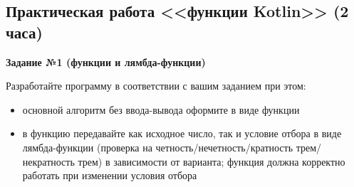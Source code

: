 \subsection{Практическая работа <<функции Kotlin>> (2 часа)}

\textbf{Задание №1 (функции и лямбда-функции)} 

Разработайте программу в соответствии с вашим заданием при этом:

\begin{itemize}
\item основной алгоритм без ввода-вывода оформите в виде функции
\item в функцию передавайте как исходное число, так и условие отбора в виде лямбда-функции (проверка на четность/нечетность/кратность трем/некратность трем) в зависимости от варианта; функция должна корректно работать при изменении условия отбора
\end{itemize}

